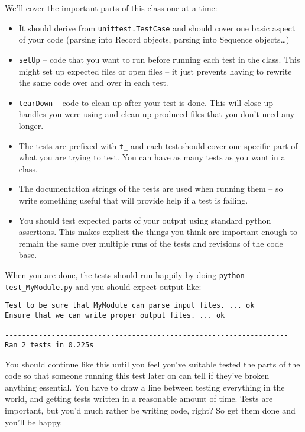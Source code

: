 \documentclass{article}
\begin{document}
We'll cover the important parts of this class one at a time:

\begin{itemize}
  \item It should derive from \verb|unittest.TestCase| and should cover
    one basic aspect of your code (parsing into Record objects, parsing
    into Sequence objects\ldots)

  \item \verb|setUp| -- code that you want to run before running each
    test in the class. This might set up expected files or open files --
    it just prevents having to rewrite the same code over and over in
    each test.

  \item \verb|tearDown| -- code to clean up after your test is done.
    This will close up handles you were using and clean up produced
    files that you don't need any longer.

  \item The tests are prefixed with \verb|t_| and each test should cover
    one specific part of what you are trying to test. You can have as
    many tests as you want in a class.

  \item The documentation strings of the tests are used when running
    them -- so write something useful that will provide help if a test
    is failing.

  \item You should test expected parts of your output using standard
    python assertions. This makes explicit the things you think are
    important enough to remain the same over multiple runs of the tests
    and revisions of the code base.
\end{itemize}

When you are done, the tests should run happily by doing 
\verb|python test_MyModule.py| and you should expect output like:

\begin{verbatim}
Test to be sure that MyModule can parse input files. ... ok
Ensure that we can write proper output files. ... ok

-------------------------------------------------------------------
Ran 2 tests in 0.225s
\end{verbatim}

You should continue like this until you feel you've suitable tested the
parts of the code so that someone running this test later on can tell if
they've broken anything essential. You have to draw a line between
testing everything in the world, and getting tests written in a
reasonable amount of time. Tests are important, but you'd much rather be
writing code, right? So get them done and you'll be happy.
\end{document}
